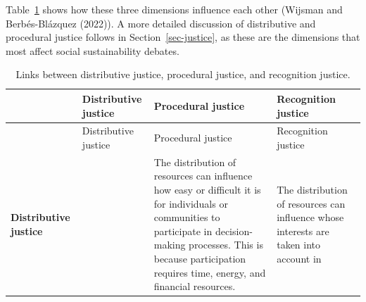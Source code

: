 \documentclass[
  a4paper,
  openany]{book}
\begin{document}
Table~\ref{tbl-justice} shows how these three dimensions influence each
other (Wijsman and Berbés-Blázquez (2022)). A more detailed discussion
of distributive and procedural justice follows in
Section~\ref{sec-justice}, as these are the dimensions that most affect
social sustainability debates.

\begin{longtable}[]{@{}
  >{\raggedright\arraybackslash}p{}
  >{\raggedright\arraybackslash}p{}
  >{\raggedright\arraybackslash}p{}
  >{\raggedright\arraybackslash}p{}@{}}
\caption{Links between distributive justice, procedural justice, and
recognition justice.}\label{tbl-justice}\tabularnewline
\toprule\noalign{}
\begin{minipage}[b]{\linewidth}\raggedright
\end{minipage} & \begin{minipage}[b]{\linewidth}\raggedright
Distributive justice
\end{minipage} & \begin{minipage}[b]{\linewidth}\raggedright
Procedural justice
\end{minipage} & \begin{minipage}[b]{\linewidth}\raggedright
Recognition justice
\end{minipage} \\
\midrule\noalign{}
\endfirsthead
\toprule\noalign{}
\begin{minipage}[b]{\linewidth}\raggedright
\end{minipage} & \begin{minipage}[b]{\linewidth}\raggedright
Distributive justice
\end{minipage} & \begin{minipage}[b]{\linewidth}\raggedright
Procedural justice
\end{minipage} & \begin{minipage}[b]{\linewidth}\raggedright
Recognition justice
\end{minipage} \\
\midrule\noalign{}
\endhead
\bottomrule\noalign{}
\endlastfoot
\textbf{Distributive justice} & & The distribution of resources can
influence how easy or difficult it is for individuals or communities to
participate in decision-making processes. This is because participation
requires time, energy, and financial resources. & The distribution of
resources can influence whose interests are taken into account in

\end{longtable}
\end{document}
